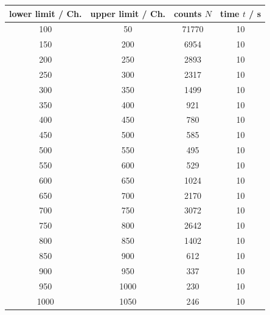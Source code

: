 \documentclass[11pt,a4paper,notitlepage]{scrartcl}
\begin{document}
\begin{table}[H]
	\centering
	\begin{tabular}{c|c|c|c}
		lower limit / Ch. & upper limit / Ch. & {counts} $N$ & {time} $t$ / s \\
		\hline
		{100}               & 50                         & 71770           & 10           \\
		{150}               & 200                        & 6954            & 10           \\
		{200}               & 250                        & 2893            & 10           \\
		{250}               & 300                        & 2317            & 10           \\
		{300}               & 350                        & 1499            & 10           \\
		{350}               & 400                        & 921             & 10           \\
		{400}               & 450                        & 780             & 10           \\
		{450}               & 500                        & 585             & 10           \\
		{500}               & 550                        & 495             & 10           \\
		{550}               & 600                        & 529             & 10           \\
		{600}               & 650                        & 1024            & 10           \\
		{650}               & 700                        & 2170            & 10           \\
		{700}               & 750                        & 3072            & 10           \\
		{750}               & 800                        & 2642            & 10           \\
		{800}               & 850                        & 1402            & 10           \\
		{850}               & 900                        & 612             & 10           \\
		{900}               & 950                        & 337             & 10           \\
		{950}               & 1000                       & 230             & 10           \\
		{1000}              & 1050                       & 246             & 10           \\

\end{tabular}
\end{table}
\end{document}
